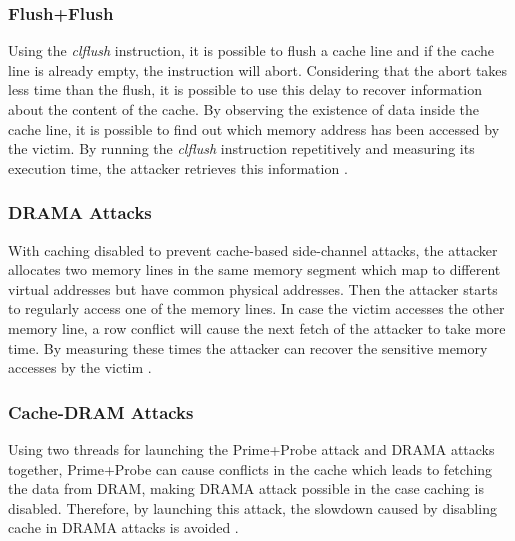 \subsubsection{Flush+Flush}
Using the \emph{clflush} instruction, it is possible to flush a cache line and if the cache line is already empty, the instruction will abort. Considering that the abort takes less time than the flush, it is possible to use this delay to recover information about the content of the cache. By observing the existence of data inside the cache line, it is possible to find out which memory address has been accessed by the victim. By running the \emph{clflush} instruction repetitively and measuring its execution time, the attacker retrieves this information \cite{flushflush}.


\subsubsection{DRAMA Attacks}
With caching disabled to prevent cache-based side-channel attacks, the attacker allocates two memory lines in the same memory segment which map to different virtual addresses but have common physical addresses. Then the attacker starts to regularly access one of the memory lines. In case the victim accesses the other memory line, a row conflict will cause the next fetch of the attacker to take more time. By measuring these times the attacker can recover the sensitive memory accesses by the victim \cite{leakycauldron,drama}.

\subsubsection{Cache-DRAM Attacks}
Using two threads for launching the Prime+Probe attack \cite{primeprobe1, primeprobe2} and DRAMA attacks \cite{drama} together, Prime+Probe can cause conflicts in the cache which leads to fetching the data from DRAM, making DRAMA attack possible in the case caching is disabled. Therefore, by launching this attack, the slowdown caused by disabling cache in DRAMA attacks is avoided \cite{leakycauldron}.


